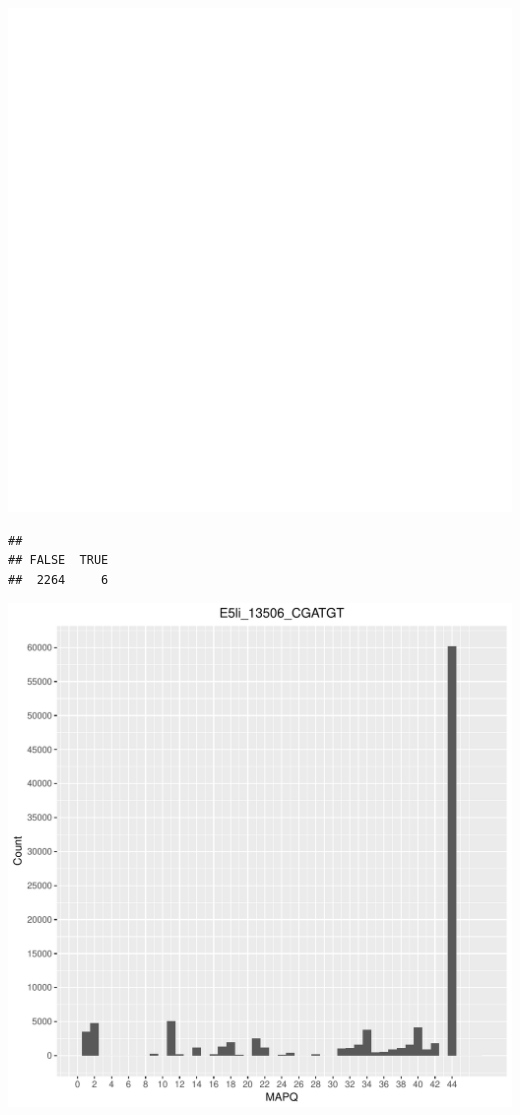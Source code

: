 \documentclass[12pt, a4paper]{article}\usepackage[]{graphicx}\usepackage[]{color}
\makeatletter
\def\maxwidth{ %
  \ifdim\Gin@nat@width>\linewidth
    \linewidth
  \else
    \Gin@nat@width
  \fi
}
\newenvironment{kframe}{%
 \def\at@end@of@kframe{}%
 \ifinner\ifhmode%
  \def\at@end@of@kframe{\end{minipage}}%
  \begin{minipage}{\columnwidth}%
 \fi\fi%
 \def\FrameCommand##1{\hskip\@totalleftmargin \hskip-\fboxsep
 \colorbox{shadecolor}{##1}\hskip-\fboxsep
     \hskip-\linewidth \hskip-\@totalleftmargin \hskip\columnwidth}%
 \MakeFramed {\advance\hsize-\width
   \@totalleftmargin\z@ \linewidth\hsize
   \@setminipage}}%
 {\par\unskip\endMakeFramed%
 \at@end@of@kframe}
\newenvironment{knitrout}{}{} %
\makeatother
\begin{document}
\begin{knitrout}
\includegraphics[width=\maxwidth]{figure/unnamed-chunk-3-28} 
\begin{kframe}\begin{verbatim}
## 
## FALSE  TRUE 
##  2264     6
\end{verbatim}
\end{kframe}
\includegraphics[width=\maxwidth]{figure/unnamed-chunk-3-29} 


\end{knitrout}
\end{document}

